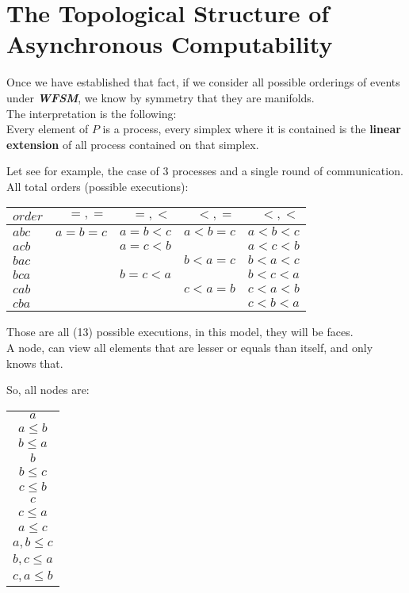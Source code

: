 \documentclass[oneside,openany]{tufte-book} %
\newcommand{\sh}{\textbf{\textit{WFSM}}\xspace}
\begin{document}
\section{The Topological Structure of Asynchronous Computability}

Once we have established that fact, if we consider all possible orderings of events under \sh, we know by symmetry that they are manifolds.\\

The interpretation is the following:\\
Every element of $P$ is a process, every simplex where it is contained is the {\bf linear extension} of all process contained on that simplex.

Let see for example, the case of 3 processes and a single round of communication.\\


All total orders (possible executions):

\begin{tabular}{ l | r r r r}
  \hline                       
$ order$ & $=,=$ & $=,<$ & $<,=$ & $<,<$\\
  \hline                       
$a b c$ & $a=b=c$ & $a=b<c$ & $a<b=c$ & $a<b<c$\\
$a c b$ &         & $a=c<b$ &         & $a<c<b$\\
$b a c$ &         &         & $b<a=c$ & $b<a<c$\\
$b c a$ &         & $b=c<a$ &         & $b<c<a$\\
$c a b$ &         &         & $c<a=b$ & $c<a<b$\\
$c b a$ &         &         &         & $c<b<a$\\
  \hline  
\end{tabular}

Those are all (13) possible executions, in this model, they will be faces.\\
A node, can view all elements that are lesser or equals than itself, and only knows that.

So, all nodes are:
\begin{tabular}{ c}
  \hline                       
$a$ \\
$a \le b$ \\
$b \le a$ \\
$b$ \\
$b \le c$ \\
$c \le b$ \\
$c$ \\
$c \le a$ \\
$a \le c$ \\
$ {a,b} \le c$ \\
$ {b,c} \le a$ \\
$ {c,a} \le b$ \\
  \hline  
\end{tabular}
\end{document}
